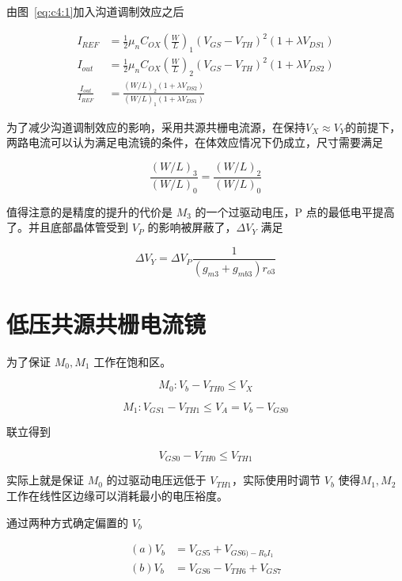 \documentclass[cn,11pt,chinese,black,simple]{../elegantbook}
\begin{document}
由图~\ref{eq:c4:1}加入沟道调制效应之后

\begin{equation}\label{eq:c4:2}
    \begin{aligned}
        I_{REF} &= \frac{1}{2} \mu_n C_{OX} \left(\frac{W}{L}\right)_1(V_{GS} - V_{TH})^2 (1 + \lambda V_{DS1}) \\
        I_{out} &= \frac{1}{2} \mu_n C_{OX} \left(\frac{W}{L}\right)_2(V_{GS} - V_{TH})^2 (1 + \lambda V_{DS2})  \\
        \frac{I_{out}}{I_{REF}} &= \frac{(W/L)_2 (1 + \lambda V_{DS2})}{(W/L)_1 (1 + \lambda V_{DS1})} 
    \end{aligned}
\end{equation}

为了减少沟道调制效应的影响，采用共源共栅电流源，在保持\(V_X \approx V_Y\)的前提下，两路电流可以认为满足电流镜的条件，在体效应情况下仍成立，尺寸需要满足

\[\frac{(W/L)_3}{(W/L)_0} = \frac{(W/L)_2}{(W/L)_0}\]

值得注意的是精度的提升的代价是 \(M_3\) 的一个过驱动电压，P 点的最低电平提高了。并且底部晶体管受到 \(V_P\) 的影响被屏蔽了，\(\Delta V_Y\) 满足

\[\Delta V_Y = \Delta V_P \frac{1}{(g_{m3} + g_{mb3}) r_{o3}}\]




\section{低压共源共栅电流镜}


为了保证 \(M_0, M_1\) 工作在饱和区。

\[M_0: V_b - V_{TH0} \leq V_X\]

\[M_1: V_{GS1} - V_{TH1} \leq V_A = V_b - V_{GS0} \]

联立得到

\[V_{GS0} - V_{TH0} \leq V_{TH1}\]

实际上就是保证 \(M_0\) 的过驱动电压远低于 \(V_{TH1}\)，实际使用时调节 \(V_b\) 使得\(M_1, M_2\) 工作在线性区边缘可以消耗最小的电压裕度。

通过两种方式确定偏置的 \(V_b\)

\begin{equation}
    \begin{aligned}
        (a) V_b &= V_{GS5} + V_{GS6) - R_b I_1} \\
        (b) V_b &= V_{GS6} - V_{TH6} + V_{GS7}
    \end{aligned}
\end{equation}
\end{document}
